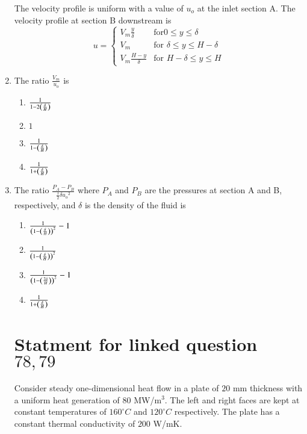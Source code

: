 \documentclass[journal,12pt,twocolumn]{IEEEtran}
\theoremstyle{remark}
\begin{document}
\begin{enumerate}[start=69]
                        The velocity profile is uniform with a value of $u_o$ at the inlet section A. The velocity profile at section B downstream is
                        $$
                        u = 
                        \begin{cases} 
                        V_m\frac{y}{\delta} & \text{for}  0 \leq y \leq \delta \\ 
                        V_m & \text{for } \delta \leq y \leq H-\delta \\ 
                        V_m\frac{H-y}{\delta} & \text{for } H-\delta \leq y \leq H 
                        \end{cases}
                        $$
                            \item The ratio $\frac{V_m}{u_o}$ is
                            \begin{enumerate}
                                \item $\frac{1}{1 - 2\left(\frac{\delta}{H}\right)}$
                                \item $1$
                                \item $\frac{1}{1 - \left(\frac{\delta}{H}\right)}$
                                \item $\frac{1}{1 + \left(\frac{\delta}{H}\right)}$
                            \end{enumerate}
                            
                            \item The ratio $\frac{P_A - P_B}{\frac{1}{2}\delta{u_o}^2}$ where $P_A$ and $P_B$ are the pressures at section A and B, respectively, and $\delta$ is the density of the fluid is
                            \begin{enumerate}
                                \item $ \frac{1}{\left(1-\left(\frac{\delta}{H}\right)\right)^2} -1$
                                \item $ \frac{1}{\left(1-\left(\frac{\delta}{H}\right)\right)^2}$
                                \item $ \frac{1}{\left(1-\left(\frac{2\delta}{H}\right)\right)^2} -1$
                                \item $ \frac{1}{1+\left(\frac{\delta}{H}\right)}$
                            \end{enumerate}
                        \section{Statment for linked question $78 ,79$}
                        Consider steady one-dimensional heat flow in a plate of $20$ mm thickness with a uniform heat generation of $80$ MW/m$^3$. The left and right faces are kept at constant temperatures of $160^\circ C$ and $120^\circ C$ respectively. The plate has a constant thermal conductivity of $200$ W/mK. 
                        

\end{enumerate}
\end{document}
